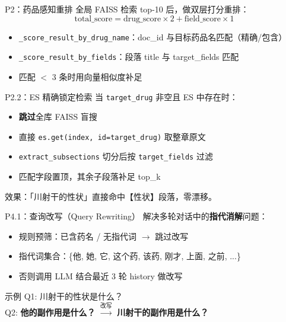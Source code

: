 \documentclass[aspectratio=169,11pt]{beamer}
\begin{document}
\begin{frame}{P2：药品感知重排}
    全局 FAISS 检索 top-10 后，做双层打分重排：
    \vspace{0.5em}
    \begin{equation*}
        \text{total\_score} = \text{drug\_score} \times 2 + \text{field\_score} \times 1
    \end{equation*}
    \vspace{0.3em}
    \begin{itemize}
        \item \texttt{\_score\_result\_by\_drug\_name}：doc\_id 与目标药品名匹配（精确/包含）
        \item \texttt{\_score\_result\_by\_fields}：段落 title 与 target\_fields 匹配
        \item 匹配 $<$ 3 条时用向量相似度补足
    \end{itemize}
\end{frame}

\begin{frame}{P2.2：ES 精确锁定检索}
    当 \texttt{target\_drug} 非空且 ES 中存在时：
    \vspace{0.5em}
    \begin{itemize}
        \item \textbf{跳过}全库 FAISS 盲搜
        \item 直接 \texttt{es.get(index, id=target\_drug)} 取整章原文
        \item \texttt{extract\_subsections} 切分后按 \texttt{target\_fields} 过滤
        \item 匹配字段置顶，其余子段落补足 top\_k
    \end{itemize}
    \vspace{0.5em}
    \alert{效果}：「川射干的性状」直接命中【性状】段落，零漂移。
\end{frame}

\begin{frame}{P4.1：查询改写（Query Rewriting）}
    解决多轮对话中的\textbf{指代消解}问题：
    \vspace{0.5em}
    \begin{itemize}
        \item 规则预筛：已含药名 / 无指代词 $\rightarrow$ 跳过改写
        \item 指代词集合：\{他, 她, 它, 这个药, 该药, 刚才, 上面, 之前, ...\}
        \item 否则调用 LLM 结合最近 3 轮 history 做改写
    \end{itemize}
    \vspace{0.5em}
    \begin{exampleblock}{示例}
        Q1: 川射干的性状是什么？\\
        Q2: \textbf{他的副作用是什么？} $\xrightarrow{\text{改写}}$ \textbf{川射干的副作用是什么？}
    \end{exampleblock}
\end{frame}
\end{document}
